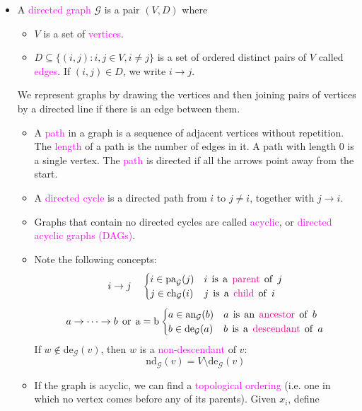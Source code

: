 \documentclass[UTF8]{book}
\newcommand{\et}{&}
\newcommand{\concept}[1]{\textcolor{magenta}{#1}}
\begin{document}
\begin{itemize}
\item A \concept{directed graph} $\mathcal{G}$ is a pair $(V,D)$ where
\begin{itemize}
	\item $V$ is a set of \concept{vertices}.
	\item $D\subseteq\{(i,j): i,j\in V, i\neq j\}$ is a set of ordered distinct pairs of $V$ called \concept{edges}. If $(i,j)\in D$, we write $i\rightarrow j$.
\end{itemize}
We represent graphs by drawing the vertices and then joining pairs of vertices by a directed line if there is an edge between them.
\begin{itemize}
	\item A \concept{path} in a graph is a sequence of adjacent vertices without repetition. The \concept{length} of a path is the number of edges in it. A path with length 0 is a single vertex. The \concept{path} is directed if all the arrows point away from the start.
	\item A \concept{directed cycle} is a directed path from $i$ to $j \neq i$, together with $j\rightarrow i$.
	\item Graphs that contain no directed cycles are called \concept{acyclic}, or \concept{directed acyclic graphs (DAGs)}.
	\item Note the following concepts:
	$$
		i\rightarrow j \quad \begin{cases}
			i \in \mathrm{pa}_\mathcal{G}(j) \et i \mathrm{\;\, is\;\, a\;\, \concept{parent}\;\, of\;\, } j\\
			j \in \mathrm{ch}_{\mathcal{G}}(i) \et j \mathrm{\;\, is\;\, a\;\, \concept{child}\;\, of\;\, }i
		\end{cases}
	$$
	$$
		a\rightarrow\cdots\rightarrow b \mathrm{\;\, or \;\, a = b} \begin{cases}
		a \in \mathrm{an}_\mathcal{G}(b) \et a \mathrm{\;\, is\;\, an \;\, \concept{ancestor} \;\, of\;\,} b \\
		b \in \mathrm{de}_\mathcal{G}(a) \et b \mathrm{\;\, is\;\, a\;\, \concept{descendant} \;\, of \;\,} a
		\end{cases}
	$$
	If $w\not\in$de$_\mathcal{G}(v)$, then $w$ is a \concept{non-descendant} of $v$:
	$$
		\mathrm{nd}_\mathcal{G}(v) = V\setminus \mathrm{de}_\mathcal{G}(v)	
	$$
	\item If the graph is acyclic, we can find a \concept{topological ordering} (i.e. one in which no vertex comes before any of its parents). Given $x_i$, define

\end{itemize}
\end{itemize}
\end{document}
